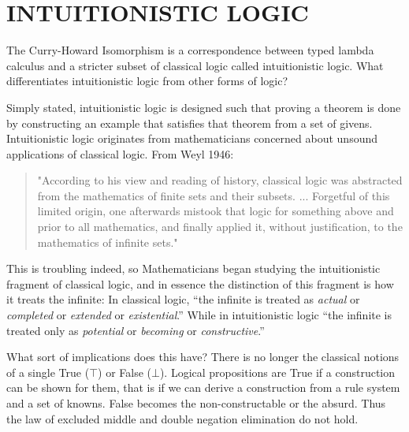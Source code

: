 \chapter{INTUITIONISTIC LOGIC}\label{ch:logic}
The Curry-Howard Isomorphism is a correspondence between typed lambda calculus and a stricter subset of classical logic called intuitionistic logic. What differentiates intuitionistic logic from other forms of logic?

Simply stated, intuitionistic logic is designed such that proving a theorem is done by constructing an example that satisfies that theorem from a set of givens. Intuitionistic logic originates from mathematicians concerned about unsound applications of classical logic. From Weyl 1946:
\begin{quote}
"According to his view and reading of history, classical logic was abstracted from the mathematics of finite sets and their subsets. ... Forgetful of this limited origin, one afterwards mistook that logic for something above and prior to all mathematics, and finally applied it, without justification, to the mathematics of infinite sets."
\end{quote}

This is troubling indeed, so Mathematicians began studying the intuitionistic fragment of classical logic, and in essence the distinction of this fragment is how it treats the infinite:
In classical logic, ``the infinite is treated as \emph{actual} or \emph{completed} or \emph{extended} or \emph{existential}.'' While in intuitionistic logic ``the infinite is treated only as \emph{potential} or \emph{becoming} or \emph{constructive}.'' \cite{metamath}

What sort of implications does this have? There is no longer the classical notions of a single True ($\top$) or False ($\bot$). Logical propositions are True if a construction can be shown for them, that is if we can derive a construction from a rule system and a set of knowns. False becomes the non-constructable or the absurd. Thus the law of excluded middle and double negation elimination do not hold.

